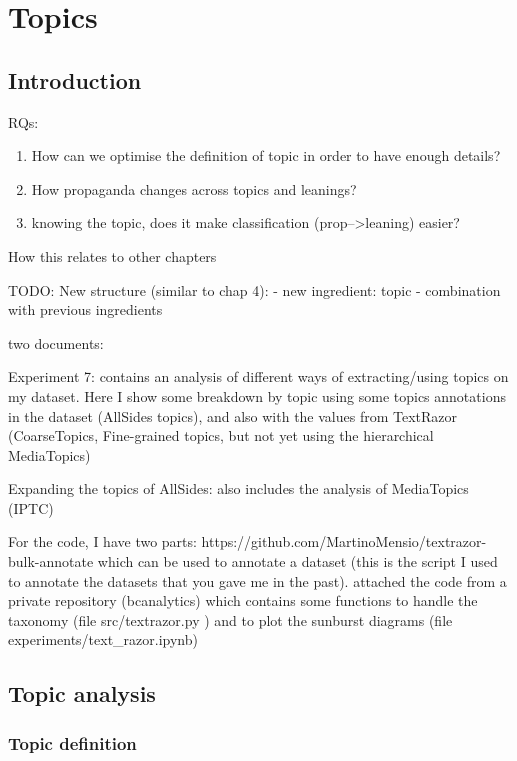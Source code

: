 \chapter{\statusred Topics}
\label{chap:topics}

\section{Introduction}
RQs:
\begin{enumerate}
    \item How can we optimise the definition of topic in order to have enough details?
    \item How propaganda changes across topics and leanings?
    \item knowing the topic, does it make classification (prop-->leaning) easier?
\end{enumerate}

How this relates to other chapters


TODO: New structure (similar to chap 4):
- new ingredient: topic
- combination with previous ingredients


two documents:

Experiment 7: contains an analysis of different ways of extracting/using topics on my dataset. Here I show some breakdown by topic using some topics annotations in the dataset (AllSides topics), and also with the values from TextRazor (CoarseTopics, Fine-grained topics, but not yet using the hierarchical MediaTopics)

Expanding the topics of AllSides: also includes the analysis of MediaTopics (IPTC)


For the code, I have two parts:
https://github.com/MartinoMensio/textrazor-bulk-annotate which can be used to annotate a dataset (this is the script I used to annotate the datasets that you gave me in the past).
attached the code from a private repository (bcanalytics) which contains some functions to handle the taxonomy (file src/textrazor.py ) and to plot the sunburst diagrams (file experiments/text\_razor.ipynb)

\section{Topic analysis}

\subsection{Topic definition}

